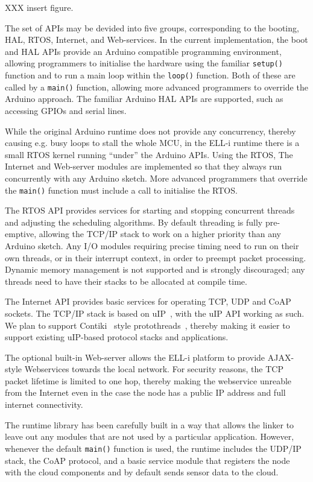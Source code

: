 \documentclass[draft,a4paper]{siamltex}
\begin{document}
XXX insert figure.

The set of APIs may be devided into five groups, corresponding to the
booting, HAL, RTOS, Internet, and Web-services.  In the current
implementation, the boot and HAL APIs provide an Arduino compatible
programming environment, allowing programmers to initialise the
hardware using the familiar \hbox{\tt setup()} function and to run a
main loop within the \hbox{\tt loop()} function.  Both of these are
called by a \hbox{\tt main()} function, allowing more advanced
programmers to override the Arduino approach.  The familiar Arduino
HAL APIs are supported, such as accessing GPIOs and serial lines.

While the original Arduino runtime does not provide any concurrency,
thereby causing e.g. busy loops to stall the whole MCU, in the ELL-i
runtime there is a small RTOS kernel running ``under'' the Arduino
APIs.  Using the RTOS, The Internet and Web-server modules are
implemented so that they always run concurrently with any Arduino
sketch.  More advanced programmers that override the \hbox{\tt main()}
function must include a call to initialise the RTOS.

The RTOS API provides services for starting and stopping concurrent
threads and adjusting the scheduling algorithms.  By default threading
is fully pre-emptive, allowing the TCP/IP stack to work on a higher
priority than any Arduino sketch.  Any I/O modules requiring precise
timing need to run on their own threads, or in their interrupt
context, in order to preempt packet processing.  Dynamic memory
management is not supported and is strongly discouraged; any threads
need to have their stacks to be allocated at compile time.

The Internet API provides basic services for operating TCP, UDP and
CoAP\cite{CoAP} sockets.  The TCP/IP stack is based on
uIP~\cite{uIP}, with the
uIP API working as such.  We plan to support Contiki~\cite{Contiki}
style protothreads~\cite{protothreads}, thereby making it easier to
support existing uIP-based protocol stacks and applications.

The optional built-in Web-server allows the ELL-i platform to provide
AJAX-style Webservices towards the local network.  For security
reasons, the TCP packet lifetime is limited to one hop, thereby making
the webservice unreable from the Internet even in the case the node
has a public IP address and full internet connectivity.

The runtime library has been carefully built in a way that allows the
linker to leave out any modules that are not used by a particular
application.  However, whenever the default \hbox{\tt main()} function
is used, the runtime includes the UDP/IP stack, the CoAP protocol, and
a basic service module that registers the node with the cloud
components and by default sends sensor data to the cloud.
\end{document}
